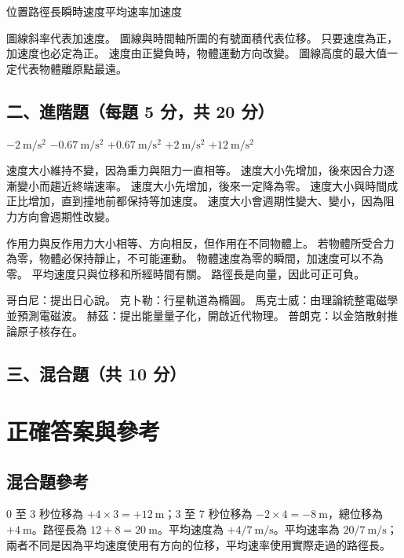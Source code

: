 \documentclass[10pt,a4paper]{article}
\begin{document}
{位置}{路徑長}{瞬時速度}{平均速率}{加速度}

{圖線斜率代表加速度。}
{圖線與時間軸所圍的有號面積代表位移。}
{只要速度為正，加速度也必定為正。}
{速度由正變負時，物體運動方向改變。}
{圖線高度的最大值一定代表物體離原點最遠。}

\subsection*{二、進階題（每題 5 分，共 20 分）}

{$-2\ \mathrm{m}/\mathrm{s}^2$}
{$-0.67\ \mathrm{m}/\mathrm{s}^2$}
{$+0.67\ \mathrm{m}/\mathrm{s}^2$}
{$+2\ \mathrm{m}/\mathrm{s}^2$}
{$+12\ \mathrm{m}/\mathrm{s}^2$}

{速度大小維持不變，因為重力與阻力一直相等。}
{速度大小先增加，後來因合力逐漸變小而趨近終端速率。}
{速度大小先增加，後來一定降為零。}
{速度大小與時間成正比增加，直到撞地前都保持等加速度。}
{速度大小會週期性變大、變小，因為阻力方向會週期性改變。}

{作用力與反作用力大小相等、方向相反，但作用在不同物體上。}
{若物體所受合力為零，物體必保持靜止，不可能運動。}
{物體速度為零的瞬間，加速度可以不為零。}
{平均速度只與位移和所經時間有關。}
{路徑長是向量，因此可正可負。}

{哥白尼：提出日心說。}
{克卜勒：行星軌道為橢圓。}
{馬克士威：由理論統整電磁學並預測電磁波。}
{赫茲：提出能量量子化，開啟近代物理。}
{普朗克：以金箔散射推論原子核存在。}

\subsection*{三、混合題（共 10 分）}


\newpage
\section*{正確答案與參考}
\begin{center}
\end{center}

\subsection*{混合題參考}
0 至 3 秒位移為 $+4\times 3=+12\ \mathrm{m}$；3 至 7 秒位移為 $-2\times 4=-8\ \mathrm{m}$，總位移為 $+4\ \mathrm{m}$。路徑長為 $12+8=20\ \mathrm{m}$。平均速度為 $+4/7\ \mathrm{m}/\mathrm{s}$。平均速率為 $20/7\ \mathrm{m}/\mathrm{s}$；兩者不同是因為平均速度使用有方向的位移，平均速率使用實際走過的路徑長。
\end{document}
